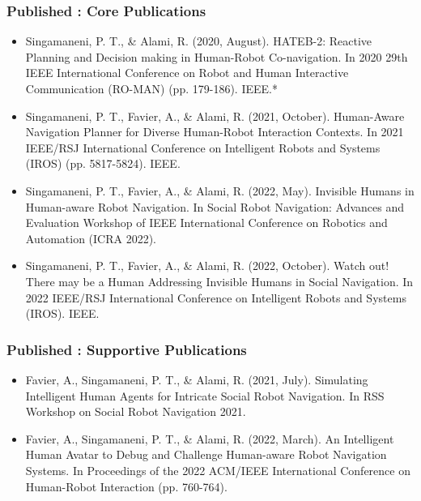 \subsubsection*{Published : Core Publications}
\begin{itemize}
    \item Singamaneni, P. T., \& Alami, R. (2020, August). HATEB-2: Reactive Planning and Decision making in Human-Robot Co-navigation. In 2020 29th IEEE International Conference on Robot and Human Interactive Communication (RO-MAN) (pp. 179-186). IEEE.* \let\thefootnote\relax{}
    
    \item Singamaneni, P. T., Favier, A., \& Alami, R. (2021, October). Human-Aware Navigation Planner for Diverse Human-Robot Interaction Contexts. In 2021 IEEE/RSJ International Conference on Intelligent Robots and Systems (IROS) (pp. 5817-5824). IEEE.
    
    \item Singamaneni, P. T., Favier, A., \& Alami, R. (2022, May). Invisible Humans in Human-aware Robot Navigation. In Social Robot Navigation: Advances and Evaluation Workshop of IEEE International Conference on Robotics and Automation (ICRA 2022).

    \item Singamaneni, P. T., Favier, A., \& Alami, R. (2022, October). Watch out! There may be a Human Addressing Invisible Humans in Social Navigation. In 2022 IEEE/RSJ International Conference on Intelligent Robots and Systems (IROS). IEEE.

\end{itemize}
\subsubsection*{Published : Supportive Publications}
\begin{itemize}

\item Favier, A., Singamaneni, P. T., \& Alami, R. (2021, July). Simulating Intelligent Human Agents for Intricate Social Robot Navigation. In RSS Workshop on Social Robot Navigation 2021.

\item Favier, A., Singamaneni, P. T., \& Alami, R. (2022, March). An Intelligent Human Avatar to Debug and Challenge Human-aware Robot Navigation Systems. In Proceedings of the 2022 ACM/IEEE International Conference on Human-Robot Interaction (pp. 760-764).
\end{itemize}

